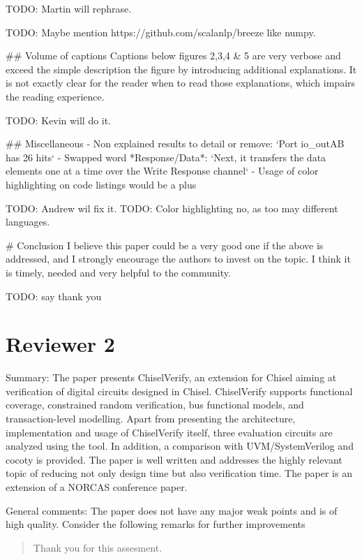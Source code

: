 \documentclass{article}
\newcommand{\todo}[1]{{\color{olive} TODO: #1}}
\newcommand{\reply}[1]{{\color{blue} #1}}
\begin{document}
\todo{Martin will rephrase.}

\todo{Maybe mention https://github.com/scalanlp/breeze like numpy.}

\#\# Volume of captions
Captions below figures 2,3,4 \& 5 are very verbose and exceed the simple description the figure by introducing additional explanations.
It is not exactly clear for the reader when to read those explanations, which impairs the reading experience.  

\todo{Kevin will do it.}

\#\# Miscellaneous
- Non explained results to detail or remove: `Port io\_outAB has 26 hits`
- Swapped word *Response/Data*: `Next, it transfers the data elements one at a time over the Write Response channel`
- Usage of color highlighting on code listings would be a plus

\todo{Andrew wil fix it.}
\todo{Color highlighting no, as too may different languages.}

\# Conclusion
I believe this paper could be a very good one if the above is addressed, and I strongly encourage the authors to invest on the topic. 
I think it is timely, needed and very helpful to the community.

\todo{say thank you}


\section*{Reviewer 2}

Summary:
The paper presents ChiselVerify, an extension for Chisel aiming at verification of digital circuits designed in Chisel. ChiselVerify supports functional coverage, constrained random verification, bus functional models, and transaction-level modelling. Apart from presenting the architecture, implementation and usage of ChiselVerify itself, three evaluation circuits are analyzed using the tool. In addition, a comparison with UVM/SystemVerilog and cocoty is provided. The paper is well written and addresses the highly relevant topic of reducing not only design time but also verification time. The paper is an extension of a NORCAS conference paper.

General comments:
The paper does not have any major weak points and is of high quality. Consider the following remarks for further improvements

\begin{quote}
\reply{Thank you for this assesment.}
\end{quote}
\end{document}
